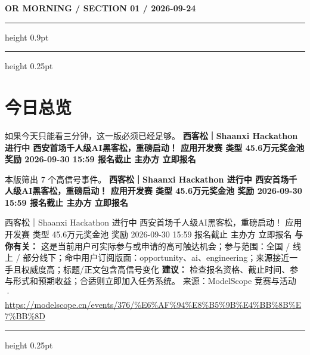 \documentclass[10.5pt]{ctexart}
\begin{document}
{\small\bfseries OR MORNING / SECTION 01 / 2026-09-24}
\vspace{2mm}
\hrule height 0.9pt
\vspace{1.5mm}
\hrule height 0.25pt
\vspace{4mm}
\section*{今日总览}
{\color{ormuted} 如果今天只能看三分钟，这一版必须已经足够。}
\vspace{2mm}
{\fontsize{25}{29}\selectfont\bfseries 西客松｜Shaanxi Hackathon 进行中 西安首场千人级AI黑客松，重磅启动！ 应用开发赛 类型 45.6万元奖金池 奖励 2026-09-30 15:59 报名截止 主办方 立即报名}\par
\vspace{2mm}
{\large 本版筛出 7 个高信号事件。}
\vspace{3mm}
{\Large\bfseries 西客松｜Shaanxi Hackathon 进行中 西安首场千人级AI黑客松，重磅启动！ 应用开发赛 类型 45.6万元奖金池 奖励 2026-09-30 15:59 报名截止 主办方 立即报名}\par
西客松｜Shaanxi Hackathon 进行中 西安首场千人级AI黑客松，重磅启动！ 应用开发赛 类型 45.6万元奖金池 奖励 2026-09-30 15:59 报名截止 主办方 立即报名
\textbf{与你有关：} 这是当前用户可实际参与或申请的高可触达机会；参与范围：全国 / 线上 / 部分线下；命中用户订阅版面：opportunity、ai、engineering；来源接近一手且权威度高；标题/正文包含高信号变化
\textbf{建议：} 检查报名资格、截止时间、参与形式和预期收益；合适则立即加入任务系统。
{\footnotesize\color{ormuted} 来源：ModelScope 竞赛与活动 · \url{https://modelscope.cn/events/376/%E6%AF%94%E8%B5%9B%E4%BB%8B%E7%BB%8D}}
\vspace{3mm}
\hrule height 0.25pt
\vspace{3mm}
\end{document}
